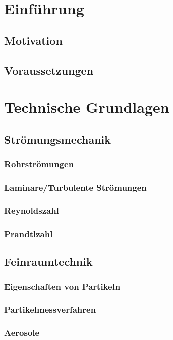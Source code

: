 \chapter{Einf\"{u}hrung}
\section{Motivation}
\section{Voraussetzungen}
%

\chapter{Technische Grundlagen}\label{ch:foundations}
\section{Str\"{o}mungsmechanik}
\subsection{Rohrstr\"{o}mungen}
\subsection{Laminare/Turbulente Str\"{o}mungen}
\subsection{Reynoldszahl}
\subsection{Prandtlzahl}

\section{Feinraumtechnik}
\subsection{Eigenschaften von Partikeln}
\subsection{Partikelmessverfahren}
\subsection{Aerosole}

